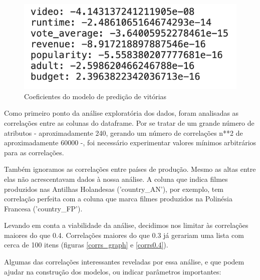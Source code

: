         \begin{figure}[htb]
        	\caption{\label{coefs_2}Coeficientes do modelo de predição de vitórias}
        	\begin{center}
        		\includegraphics[scale=0.7]{coefs_2.png}
        	\end{center}
        \end{figure}

        Como primeiro ponto da análise exploratória dos dados, foram analisadas as correlações entre as colunas do dataframe. Por se tratar de um grande número de atributos - aproximadamente 240, gerando um número de correlações n**2 de aproximadamente 60000 -, foi necessário experimentar valores mínimos arbitrários para as correlações.

        Também ignoramos as correlações entre países de produção. Mesmo as altas entre elas não acrescentavam dados à nossa análise. A coluna que indica filmes produzidos nas Antilhas Holandesas ('country\_AN'), por exemplo, tem correlação perfeita com a coluna que marca filmes produzidos na Polinésia Francesa ('country\_FP').\par

        Levando em conta a viabilidade da análise, decidimos nos limitar às correlações maiores do que 0.4. Correlações maiores do que 0.3 já gerariam uma lista com cerca de 100 itens (figuras \ref{corrs_graph} e \ref{corrs0.4}). \par

        Algumas das correlações interessantes reveladas por essa análise, e que podem ajudar na construção dos modelos, ou indicar parâmetros importantes:

